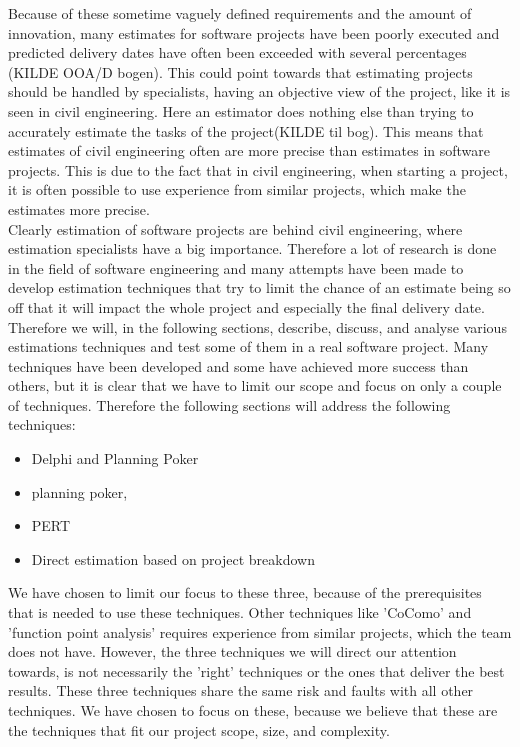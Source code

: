 Because of these sometime vaguely defined requirements and the amount of innovation, many estimates for software projects have been poorly executed and predicted delivery dates have often been exceeded with several percentages (KILDE OOA/D bogen). This could point towards that estimating projects should be handled by specialists, having an objective view of the project, like it is seen in civil engineering. Here an estimator does nothing else than trying to accurately estimate the tasks of the project(KILDE til bog). This means that estimates of civil engineering often are more precise than estimates in software projects. This is due to the fact that in civil engineering, when starting a project, it is often possible to use experience from similar projects, which make the estimates more precise. \\
Clearly estimation of software projects are behind civil engineering, where estimation specialists have a big importance. Therefore a lot of research is done in the field of software engineering and many attempts have been made to develop estimation techniques that try to limit the chance of an estimate being so off that it will impact the whole project and especially the final delivery date. \\
Therefore we will, in the following sections, describe, discuss, and analyse various estimations techniques and test some of them in a real software project. Many techniques have been developed and some have achieved more success than others, but it is clear that we have to limit our scope and focus on only a couple of techniques. Therefore the following sections will address the following techniques: 
\begin{itemize}
\item Delphi and Planning Poker 
\item planning poker, 
\item PERT 
\item Direct estimation based on project breakdown
\end{itemize}
We have chosen to limit our focus to these three, because of the prerequisites that is needed to use these techniques. Other techniques like 'CoComo' and 'function point analysis' requires experience from similar projects, which the team does not have. However, the three techniques we will direct our attention towards, is not necessarily the 'right' techniques or the ones that deliver the best results. These three techniques share the same risk and faults with all other techniques. We have chosen to focus on these, because we believe that these are the techniques that fit our project scope, size, and complexity.
\\


